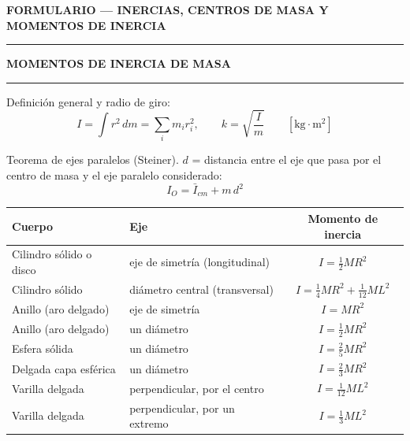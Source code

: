 \documentclass[10pt,a4paper]{article}
\newcommand{\seccion}[1]{%
  \vspace{2mm}\hrule\vspace{1mm}%
  \textbf{\footnotesize\MakeUppercase{#1}}\vspace{1mm}\hrule\vspace{2mm}}
\begin{document}
\small

\begin{center}\renewcommand{\arraystretch}{1.45}\normalsize
  \textbf{\large FORMULARIO — INERCIAS, CENTROS DE MASA Y MOMENTOS DE INERCIA}
\end{center}
\vspace{-2mm}

\seccion{Momentos de inercia de masa}

Definición general y radio de giro:
\begin{equation*}
  I = \int r^{2}\,dm = \sum_i m_i r_i^{2},
  \qquad
  k = \sqrt{\frac{I}{m}}
  \qquad [\mathrm{kg\cdot m^{2}}]
\end{equation*}

Teorema de ejes paralelos (Steiner). $d$ = distancia entre el eje que pasa
por el centro de masa y el eje paralelo considerado:
\begin{equation*}
  I_{O} = \bar{I}_{cm} + m\,d^{2}
\end{equation*}

\begin{center}\renewcommand{\arraystretch}{1.45}\normalsize
\begin{tabular}{@{}llc@{}}
\toprule
\textbf{Cuerpo} & \textbf{Eje} & \textbf{Momento de inercia} \\
\midrule
Cilindro sólido o disco   & eje de simetría (longitudinal) & $I = \frac{1}{2}MR^{2}$ \\
Cilindro sólido           & diámetro central (transversal) & $I = \frac{1}{4}MR^{2} + \frac{1}{12}ML^{2}$ \\
Anillo (aro delgado)      & eje de simetría                & $I = MR^{2}$ \\
Anillo (aro delgado)      & un diámetro                    & $I = \frac{1}{2}MR^{2}$ \\
Esfera sólida             & un diámetro                    & $I = \frac{2}{5}MR^{2}$ \\
Delgada capa esférica     & un diámetro                    & $I = \frac{2}{3}MR^{2}$ \\
Varilla delgada           & perpendicular, por el centro   & $I = \frac{1}{12}ML^{2}$ \\
Varilla delgada           & perpendicular, por un extremo  & $I = \frac{1}{3}ML^{2}$ \\
\bottomrule
\end{tabular}
\end{center}
\end{document}
